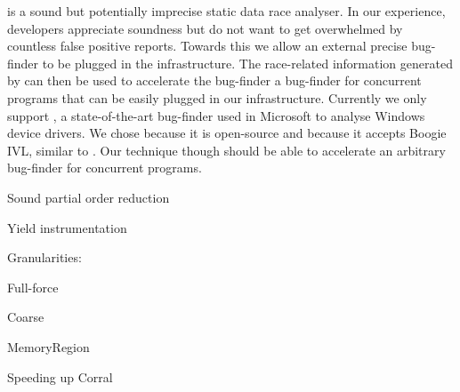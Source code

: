 \whoop is a sound but potentially imprecise static data race analyser. In our experience, developers appreciate soundness but do not want to get overwhelmed by countless false positive reports. Towards this we allow an external precise bug-finder to be plugged in the \whoop infrastructure. The race-related information generated by \whoop can then be used to accelerate the bug-finder a bug-finder for concurrent programs that can be easily plugged in our infrastructure. Currently we only support \corral, a state-of-the-art bug-finder used in Microsoft to analyse Windows device drivers. We chose \corral because it is open-source and because it accepts Boogie IVL, similar to \whoop. Our technique though should be able to accelerate an arbitrary bug-finder for concurrent programs.

Sound partial order reduction

Yield instrumentation

Granularities:

Full-force

Coarse

MemoryRegion

Speeding up Corral

